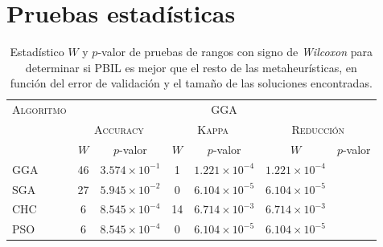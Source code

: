 \chapter{Pruebas estadísticas}
\label{Apéndices}

\begin{table}[]
\centering
\begin{tabular}{l c c c c c c}
\hline
\multirow{3}{*}{\textsc{Algoritmo}}
	& \multicolumn{6}{c}{\textsc{GGA}} \\
	& \multicolumn{2}{c}{\textsc{Accuracy}}
	& \multicolumn{2}{c}{\textsc{Kappa}}
	& \multicolumn{2}{c}{\textsc{Reducción}} \\
 & $W$ & $p$-valor & $W$ & $p$-valor & $W$ & $p$-valor \\
\hline
\hline

GGA & 46 & $3.574 \times 10^{-1}$ &  1 & $1.221 \times 10^{-4}$ & $1.221 \times 10^{-4}$ \\
SGA & 27 & $5.945 \times 10^{-2}$ &  0 & $6.104 \times 10^{-5}$ & $6.104 \times 10^{-5}$ \\
CHC &  6 & $8.545 \times 10^{-4}$ & 14 & $6.714 \times 10^{-3}$ & $6.714 \times 10^{-3}$ \\
PSO &  6 & $8.545 \times 10^{-4}$ &  0 & $6.104 \times 10^{-5}$ & $6.104 \times 10^{-5}$ \\

\hline
\end{tabular}
\caption[Pruebas de \emph{Wilcoxon} entre GGA y las demás metaheurísticas]{Estadístico $W$ y $p$-valor de pruebas de rangos con signo de \emph{Wilcoxon} para determinar si PBIL es mejor que el resto de las metaheurísticas, en función del error de validación y el tamaño de las soluciones encontradas.}
\label{wilcox-res-pbil}
\end{table}
